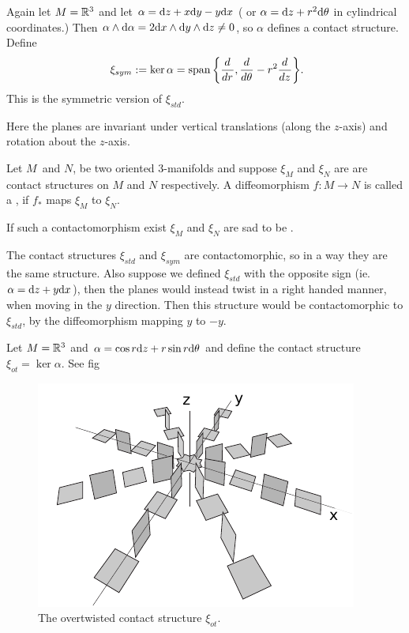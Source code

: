 \begin{exmp}
Again let $M = \mathbb{R}^3$ and let $\alpha = \mathrm{d} z + x\mathrm{d} y - y \mathrm{d} x$ ( or $\alpha = \mathrm{d}
z + r^2 \mathrm{d} \theta$ in cylindrical coordinates.) Then $\alpha \wedge \mathrm{d} \alpha =
2 \mathrm{d} x \wedge \mathrm{d} y \wedge \mathrm{d} z \ne 0$, so $\alpha$ defines a contact structure.
Define 
\[  \xi_{sym} := \ker\alpha = \spann\qty{ \dd{r}, \dd \theta - r^2 \dd{z} }. \]
This is the symmetric version of $\xi_{std}$.
\end{exmp}


%  

Here the planes are invariant under vertical translations (along the $z$-axis)
and rotation about the $z$-axis. 

\begin{defn}
Let $M$ and $N$, be two oriented 3-manifolds and suppose $\xi_M$ and $\xi_N$ are
are contact structures on $M$ and $N$ respectively. 
A diffeomorphism $f: M \to N$ is called a , if $f_*$ maps
$\xi_M$ to $\xi_N$. 

If such a contactomorphism exist $\xi_M$ and $\xi_N$ are sad to be
.
\end{defn}


The contact structures $\xi_{std}$ and $\xi_{sym}$ are contactomorphic, so in
a way they are the same structure. 
%
%
%
%
Also suppose we defined $\xi_{std}$ with
the opposite sign (ie. $\alpha = \mathrm{d} z + y\mathrm{d} x$), then the planes would instead
twist in a right handed manner, when moving in the $y$ direction. Then this
structure would be contactomorphic to $\xi_{std}$, by the diffeomorphism mapping
$y$ to $-y$.

\begin{exmp}
Let $M=\mathbb{R}^3$ and $\alpha = \cos r \mathrm{d} z + r \sin r \mathrm{d} \theta$ and define the
contact structure $\xi_{ot} = \ker \alpha$. See fig 
\end{exmp}

\begin{figure}
\centering
\includegraphics[width=.4\textwidth]{figs/overtwisted.pdf}
\caption{The overtwisted contact structure $\xi_{ot}$.}
\label{fig:overtwisted}
\end{figure}

